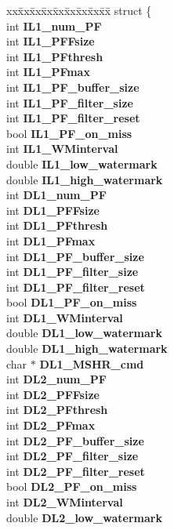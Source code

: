 \begin{CompactItemize}
\begin{tabbing}
\end{tabbing}\item 
\begin{tabbing}
xx\=xx\=xx\=xx\=xx\=xx\=xx\=xx\=xx\=\kill
struct \{\\
\>int {\bf IL1\_num\_PF}\\
\>int {\bf IL1\_PFFsize}\\
\>int {\bf IL1\_PFthresh}\\
\>int {\bf IL1\_PFmax}\\
\>int {\bf IL1\_PF\_buffer\_size}\\
\>int {\bf IL1\_PF\_filter\_size}\\
\>int {\bf IL1\_PF\_filter\_reset}\\
\>bool {\bf IL1\_PF\_on\_miss}\\
\>int {\bf IL1\_WMinterval}\\
\>double {\bf IL1\_low\_watermark}\\
\>double {\bf IL1\_high\_watermark}\\
\>int {\bf DL1\_num\_PF}\\
\>int {\bf DL1\_PFFsize}\\
\>int {\bf DL1\_PFthresh}\\
\>int {\bf DL1\_PFmax}\\
\>int {\bf DL1\_PF\_buffer\_size}\\
\>int {\bf DL1\_PF\_filter\_size}\\
\>int {\bf DL1\_PF\_filter\_reset}\\
\>bool {\bf DL1\_PF\_on\_miss}\\
\>int {\bf DL1\_WMinterval}\\
\>double {\bf DL1\_low\_watermark}\\
\>double {\bf DL1\_high\_watermark}\\
\>char $\ast$ {\bf DL1\_MSHR\_cmd}\\
\>int {\bf DL2\_num\_PF}\\
\>int {\bf DL2\_PFFsize}\\
\>int {\bf DL2\_PFthresh}\\
\>int {\bf DL2\_PFmax}\\
\>int {\bf DL2\_PF\_buffer\_size}\\
\>int {\bf DL2\_PF\_filter\_size}\\
\>int {\bf DL2\_PF\_filter\_reset}\\
\>bool {\bf DL2\_PF\_on\_miss}\\
\>int {\bf DL2\_WMinterval}\\
\>double {\bf DL2\_low\_watermark}\\

\end{tabbing}
\end{CompactItemize}
